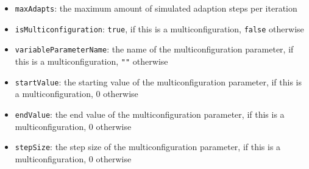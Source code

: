 \documentclass[parskip=full,11pt]{scrartcl}
\begin{document}
\begin{itemize}
\item[] \texttt{maxAdapts}: the maximum amount of simulated adaption steps per iteration
\item[] \texttt{isMulticonfiguration}: \texttt{true}, if this is a multiconfiguration, \texttt{false} otherwise
\item[] \texttt{variableParameterName}: the name of the multiconfiguration parameter, if this is a multiconfiguration, \texttt{""} otherwise
\item[] \texttt{startValue}: the starting value of the multiconfiguration parameter, if this is a multiconfiguration, \(0\) otherwise
\item[] \texttt{endValue}: the end value of the multiconfiguration parameter, if this is a multiconfiguration, \(0\) otherwise
\item[] \texttt{stepSize}: the step size of the multiconfiguration parameter, if this is a multiconfiguration, \(0\) otherwise
\end{itemize}
\end{document}
